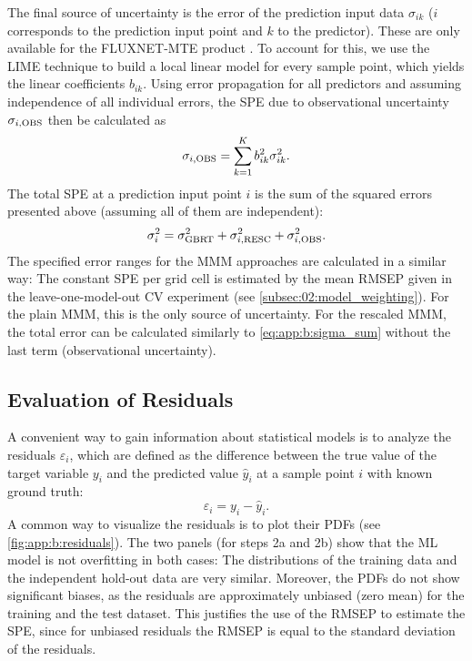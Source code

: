 The final source of uncertainty is the error of the prediction input data
$\sigma_{ik}$ ($i$ corresponds to the prediction input point and $k$ to the
predictor). These are only available for the FLUXNET-MTE product
\autocite{Jung2011}. To account for this, we use the \acf{LIME} technique
 to build a local linear
model for every sample point, which yields the linear coefficients $b_{ik}$.
Using error propagation for all predictors and assuming independence of all
individual errors, the \ac{SPE} due to observational uncertainty $\sigma_{i,
  \textnormal{OBS}}$ then be calculated as
\begin{equation}
  \sigma_{i, \textnormal{OBS}} = \sum_{k=1}^{K} b_{ik}^2 \sigma_{ik}^2.
  \label{eq:app:b:sigma_obs}
\end{equation}
The total \ac{SPE} at a prediction input point $i$ is the sum of the squared
errors presented above (assuming all of them are independent):
\begin{equation}
  \sigma_i^2 = \sigma_{\textnormal{GBRT}}^2 + \sigma_{i, \textnormal{RESC}}^2 +
  \sigma_{i, \textnormal{OBS}}^2.
  \label{eq:app:b:sigma_sum}
\end{equation}
The specified error ranges for the \ac{MMM} approaches are calculated in a
similar way: The constant \ac{SPE} per grid cell is estimated by the mean
\ac{RMSEP} given in the leave-one-model-out \ac{CV} experiment (see
\cref{subsec:02:model_weighting}). For the plain \ac{MMM}, this is the only
source of uncertainty. For the rescaled \ac{MMM}, the total error can be
calculated similarly to \cref{eq:app:b:sigma_sum} without the last term
(observational uncertainty).


\subsection{Evaluation of Residuals}
\label{subsec:app:b:residuals}

A convenient way to gain information about statistical models is to analyze the
residuals $\varepsilon_i$, which are defined as the difference between the true
value of the target variable $y_i$ and the predicted value $\hat{y}_i$ at a
sample point $i$ with known ground truth:
\begin{equation}
  \varepsilon_i = y_i - \hat{y}_i.
  \label{eq:app:b:residuals}
\end{equation}
A common way to visualize the residuals is to plot their \acfp{PDF} (see
\cref{fig:app:b:residuals}). The two panels (for steps 2a and 2b) show that the
\ac{ML} model is not overfitting in both cases: The distributions of the
training data and the independent hold-out data are very similar. Moreover, the
\acp{PDF} do not show significant biases, as the residuals are approximately
unbiased (zero mean) for the training and the test dataset. This justifies the
use of the \ac{RMSEP} to estimate the \ac{SPE}, since for unbiased residuals
the \ac{RMSEP} is equal to the standard deviation of the residuals.

